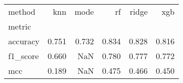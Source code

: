 \begin{tabular}{lrrrrr}
\toprule
method & knn & mode & rf & ridge & xgb \\
metric &  &  &  &  &  \\
\midrule
accuracy & 0.751 & 0.732 & 0.834 & 0.828 & 0.816 \\
f1_score & 0.660 & NaN & 0.780 & 0.777 & 0.772 \\
mcc & 0.189 & NaN & 0.475 & 0.466 & 0.450 \\
\bottomrule
\end{tabular}
